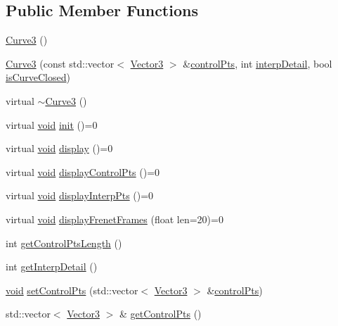 \subsection*{Public Member Functions}
\begin{DoxyCompactItemize}
\item 
\hyperlink{class_curve3_a547ab0feb6df06069ab395cef6a1694f}{Curve3} ()
\item 
\hyperlink{class_curve3_afb01df0701d99622de0d9e3cb4f15f4a}{Curve3} (const std\-::vector$<$ \hyperlink{class_vector3}{Vector3} $>$ \&\hyperlink{class_curve3_a2e9e6cfb4a03fffea0b4adbec17bba80}{control\-Pts}, int \hyperlink{class_curve3_a5ab0207ec14b339175e0aa9d621d70a7}{interp\-Detail}, bool \hyperlink{class_curve3_a94b01af1a451e35dbcec9ef36c4b4a64}{is\-Curve\-Closed})
\item 
virtual \hyperlink{class_curve3_a71cd69a17bdb9ae83013465377ba6303}{$\sim$\-Curve3} ()
\item 
virtual \hyperlink{glutf90_8h_ac778d6f63f1aaf8ebda0ce6ac821b56e}{void} \hyperlink{class_curve3_a5bffd69c283961491c639c459d2c06d2}{init} ()=0
\item 
virtual \hyperlink{glutf90_8h_ac778d6f63f1aaf8ebda0ce6ac821b56e}{void} \hyperlink{class_curve3_ae566fa302081043360e311be599377c3}{display} ()=0
\item 
virtual \hyperlink{glutf90_8h_ac778d6f63f1aaf8ebda0ce6ac821b56e}{void} \hyperlink{class_curve3_a8183be163e44fd6030ea3831df2fe8f3}{display\-Control\-Pts} ()=0
\item 
virtual \hyperlink{glutf90_8h_ac778d6f63f1aaf8ebda0ce6ac821b56e}{void} \hyperlink{class_curve3_a28ddf803ec40027cc21782467145bf38}{display\-Interp\-Pts} ()=0
\item 
virtual \hyperlink{glutf90_8h_ac778d6f63f1aaf8ebda0ce6ac821b56e}{void} \hyperlink{class_curve3_a5c0803a212a6792c17afd816a15af449}{display\-Frenet\-Frames} (float len=20)=0
\item 
int \hyperlink{class_curve3_ab2a5225d1a8d5b65013a5db64fd25b68}{get\-Control\-Pts\-Length} ()
\item 
int \hyperlink{class_curve3_a3752f730b20002e170a86cf4629b412a}{get\-Interp\-Detail} ()
\item 
\hyperlink{glutf90_8h_ac778d6f63f1aaf8ebda0ce6ac821b56e}{void} \hyperlink{class_curve3_a00a6510f2972f38f54c941ea92de0fc0}{set\-Control\-Pts} (std\-::vector$<$ \hyperlink{class_vector3}{Vector3} $>$ \&\hyperlink{class_curve3_a2e9e6cfb4a03fffea0b4adbec17bba80}{control\-Pts})
\item 
std\-::vector$<$ \hyperlink{class_vector3}{Vector3} $>$ \& \hyperlink{class_curve3_a91703b9049e93bc2c9af527cb5bcc3cb}{get\-Control\-Pts} ()

\end{DoxyCompactItemize}
